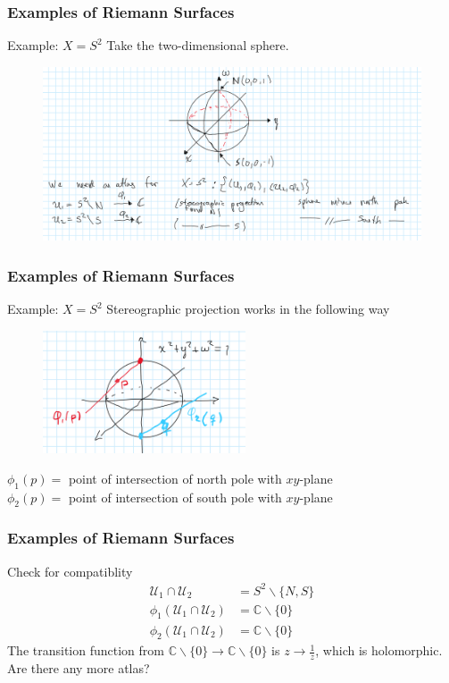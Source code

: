 \documentclass{beamer}[10]
\begin{document}
\begin{frame}
	\frametitle{Examples of Riemann Surfaces}
	\begin{block}{Example: $X=S^2$}
		Take the two-dimensional sphere.	
	\end{block}
	\begin{figure}\vspace*{-0.7cm}\hspace*{-0.7cm}
		\includegraphics[width=12cm]{7}
	\end{figure}
\end{frame}

\begin{frame}
	\frametitle{Examples of Riemann Surfaces}
	\begin{block}{Example: $X=S^2$}
	Stereographic projection works in the following way
	\end{block}
	\begin{figure}
		\includegraphics[width=6cm]{8}
	\end{figure}
	$\phi_1(p)=$ point of intersection of north pole with $xy$-plane\\
	$\phi_2(p)=$ point of intersection of south pole with $xy$-plane
\end{frame}

\begin{frame}
	\frametitle{Examples of Riemann Surfaces}
	\begin{block}{Check for compatiblity}
	\begin{equation}
		\begin{aligned}
			\mathcal{U}_{1}\cap \mathcal{U}_{2}&=S^2\backslash\{N,S\}\\
			\phi_1(\mathcal{U}_{1}\cap \mathcal{U}_{2})&=\mathds{C}\backslash\{0\}\\
			\phi_2(\mathcal{U}_{1}\cap \mathcal{U}_{2})&=\mathds{C}\backslash\{0\}
		\end{aligned}
	\end{equation}
	The transition function from $\mathds{C}\backslash\{0\}\to \mathds{C}\backslash\{0\}$ is $z\to \frac{1}{z}$, which is holomorphic.\\
	Are there any more atlas?
	\end{block}
\end{frame}
\end{document}
